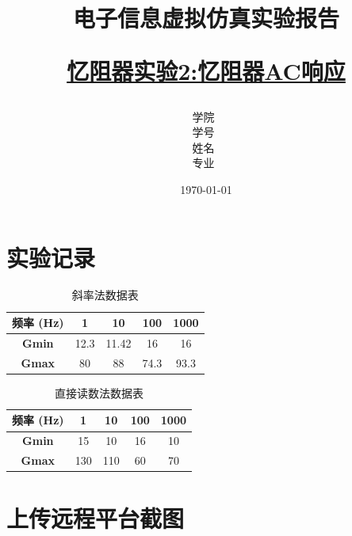 \documentclass[12pt,hyperref,a4paper,UTF8]{ctexart}
\title{ 
        \vspace{1cm}
        \heiti \Huge \textbf{电子信息虚拟仿真实验报告} \par
        \vspace{1cm} 
        \heiti \Large {\underline{忆阻器实验2:忆阻器AC响应}   } 
        \vspace{3cm}
    
    }
\author{
        \vspace{0.5cm}
        \kaishu\Large 学院\ \dlmu[9cm]{卓越学院} \\ %
        \vspace{0.5cm}
        \kaishu\Large 学号\ \dlmu[9cm]{23040447} \\ %
        \vspace{0.5cm}
        \kaishu\Large 姓名\ \dlmu[9cm]{陈文轩} \qquad  \\ %
        \vspace{0.5cm}
        \kaishu\Large 专业\ \dlmu[9cm]{智能硬件与系统(电子信息工程)} \qquad \\ %
    }
\date{\today} %
\begin{document}
\cover
\thispagestyle{empty} %







\newpage
\setcounter{page}{1} %


\section{实验记录}

\begin{table}[H]
    \centering
    \caption{斜率法数据表}
    \begin{tabular}{|c|c|c|c|c|}
    \hline
    \textbf{频率 (Hz)} & \textbf{1} & \textbf{10} & \textbf{100} & \textbf{1000} \\ \hline
    \textbf{Gmin} &12.3 &11.42 &16 &16 \\ \hline
    \textbf{Gmax} &80&88&74.3 &93.3\\ \hline
    \end{tabular}
    \label{tab:slope_method}
\end{table}

\begin{table}[H]
    \centering
    \caption{直接读数法数据表}
    \begin{tabular}{|c|c|c|c|c|}
    \hline
    \textbf{频率 (Hz)} & \textbf{1} & \textbf{10} & \textbf{100} & \textbf{1000} \\ \hline
    \textbf{Gmin} &15&10&16& 10\\ \hline
    \textbf{Gmax} &130&110 &60&70 \\ \hline
    \end{tabular}
    \label{tab:direct_reading_method}
\end{table}


\section{上传远程平台截图}
\end{document}
